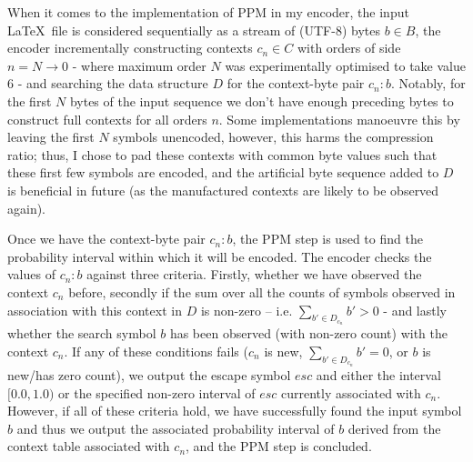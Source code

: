 \documentclass[a4paper, 11pt]{article}
\begin{document}
When it comes to the implementation of PPM in my encoder, the input \LaTeX\ file is considered sequentially as a stream of (UTF-8) bytes $b \in B$, the encoder incrementally constructing contexts $c_{n} \in C$ with orders of side $n = N \to 0$ - where maximum order $N$ was experimentally optimised to take value $6$ - and searching the data structure $D$ for the context-byte pair $c_{n} \colon b$. Notably, for the first $N$ bytes of the input sequence we don’t have enough preceding bytes to construct full contexts for all orders $n$. Some implementations manoeuvre this by leaving the first $N$ symbols unencoded, however, this harms the compression ratio; thus, I chose to pad these contexts with common byte values such that these first few symbols are encoded, and the artificial byte sequence added to $D$ is beneficial in future (as the manufactured contexts are likely to be observed again).

Once we have the context-byte pair $c_{n} \colon b$, the PPM step is used to find the probability interval within which it will be encoded. The encoder checks the values of $c_{n} \colon b$ against three criteria. Firstly, whether we have observed the context $c_{n}$ before, secondly if the sum over all the counts of symbols observed in association with this context in $D$ is non-zero – i.e. $\sum_{b' \in D_{c_{n}}} b' > 0$ - and lastly whether the search symbol $b$ has been observed (with non-zero count) with the context $c_{n}$. If any of these conditions fails ($c_{n}$ is new, $\sum_{b' \in D_{c_{n}}} b' = 0$, or $b$ is new/has zero count), we output the escape symbol $esc$ and either the interval $[0.0, 1.0)$ or the specified non-zero interval of $esc$ currently associated with $c_{n}$. However, if all of these criteria hold, we have successfully found the input symbol $b$ and thus we output the associated probability interval of $b$ derived from the context table associated with $c_{n}$, and the PPM step is concluded.
\end{document}
